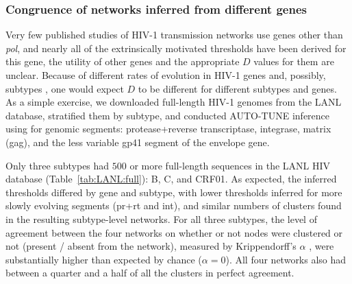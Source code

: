 \documentclass[utf8]{FrontiersinHarvard} %
\begin{document}
\subsubsection{Congruence of networks inferred from different genes}

Very few published studies of HIV-1 transmission networks use genes other than
	{\it pol}, and nearly all of the extrinsically motivated thresholds have been
derived for this gene, the utility of other genes and the appropriate $D$
values for them are unclear. Because of different rates of evolution in HIV-1
genes and, possibly, subtypes \cite{Penn:2008aa}, one would expect $D$ to be
different for different subtypes and genes. As a simple exercise, we downloaded
full-length HIV-1 genomes from the LANL database,  stratified them by subtype,
and conducted AUTO-TUNE inference using for genomic segments: protease+reverse
transcriptase, integrase, matrix (gag), and the less variable gp41 segment of
the envelope gene.

Only three subtypes had $500$ or more full-length sequences in the LANL HIV
database (Table~\ref{tab:LANL:full}): B, C, and CRF01. As expected, the
inferred thresholds differed by gene and subtype, with lower thresholds
inferred for more slowly evolving segments (pr+rt and int), and similar numbers
of clusters found in the resulting subtype-level networks. For all three
subtypes, the level of agreement between the four networks on whether or not
nodes were clustered or not (present / absent from the network), measured by
Krippendorff's $\alpha$ \cite{doi:10.1080/19312450709336664}, were
substantially higher than expected by chance ($\alpha = 0$). All four networks
also had between a quarter and a half of all the clusters in perfect agreement. 
\end{document}
